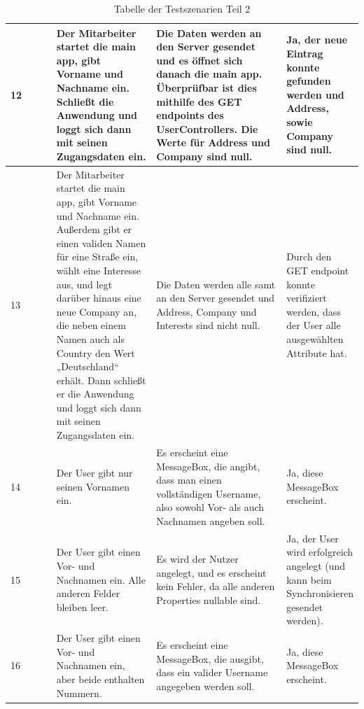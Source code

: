 \newpage
\begin{table}[h]
	\centering
	\begin{tabular}{|p{0.15\linewidth}|p{0.3\linewidth}|p{0.4\linewidth}|p{0.15\linewidth}|}
		\hline
		12 & Der Mitarbeiter startet die main app, gibt Vorname und Nachname ein. Schließt die Anwendung und loggt sich dann mit seinen Zugangsdaten ein. & Die Daten werden an den Server gesendet und es öffnet sich danach die main app. Überprüfbar ist dies mithilfe des GET endpoints des UserControllers. Die Werte für Address und Company sind null. & Ja, der neue Eintrag konnte gefunden werden und Address, sowie Company sind null. \\ \hline
		13 & Der Mitarbeiter startet die main app, gibt Vorname und Nachname ein. Außerdem gibt er einen validen Namen für eine Straße ein, wählt eine Interesse aus, und legt darüber hinaus eine neue Company an, die neben einem Namen auch als Country den Wert „Deutschland“ erhält. Dann schließt er die Anwendung und loggt sich dann mit seinen Zugangsdaten ein. & Die Daten werden alle samt an den Server gesendet und Address, Company und Interests sind nicht null. & Durch den GET endpoint konnte verifiziert werden, dass der User alle ausgewählten Attribute hat. \\ \hline
		14 & Der User gibt nur seinen Vornamen ein. & Es erscheint eine MessageBox, die angibt, dass man einen vollständigen Username, also sowohl Vor- als auch Nachnamen angeben soll. & Ja, diese MessageBox erscheint. \\ \hline
		15 & Der User gibt einen Vor- und Nachnamen ein. Alle anderen Felder bleiben leer. & Es wird der Nutzer angelegt, und es erscheint kein Fehler, da alle anderen Properties nullable sind. & Ja, der User wird erfolgreich angelegt (und kann beim Synchronisieren gesendet werden). \\ \hline
		16 & Der User gibt einen Vor- und Nachnamen ein, aber beide enthalten Nummern. & Es erscheint eine MessageBox, die ausgibt, dass ein valider Username angegeben werden soll. & Ja, diese MessageBox erscheint. \\ \hline
	\end{tabular}
	\caption{Tabelle der Testszenarien Teil 2}
\end{table}

